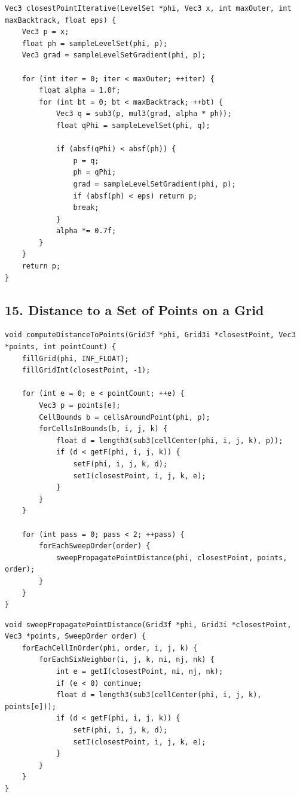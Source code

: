 \documentclass[10pt,letterpaper]{article}
\begin{document}
\begin{verbatim}
Vec3 closestPointIterative(LevelSet *phi, Vec3 x, int maxOuter, int maxBacktrack, float eps) {
    Vec3 p = x;
    float ph = sampleLevelSet(phi, p);
    Vec3 grad = sampleLevelSetGradient(phi, p);

    for (int iter = 0; iter < maxOuter; ++iter) {
        float alpha = 1.0f;
        for (int bt = 0; bt < maxBacktrack; ++bt) {
            Vec3 q = sub3(p, mul3(grad, alpha * ph));
            float qPhi = sampleLevelSet(phi, q);

            if (absf(qPhi) < absf(ph)) {
                p = q;
                ph = qPhi;
                grad = sampleLevelSetGradient(phi, p);
                if (absf(ph) < eps) return p;
                break;
            }
            alpha *= 0.7f;
        }
    }
    return p;
}
\end{verbatim}

\subsection*{15. Distance to a Set of Points on a Grid}

\begin{verbatim}
void computeDistanceToPoints(Grid3f *phi, Grid3i *closestPoint, Vec3 *points, int pointCount) {
    fillGrid(phi, INF_FLOAT);
    fillGridInt(closestPoint, -1);

    for (int e = 0; e < pointCount; ++e) {
        Vec3 p = points[e];
        CellBounds b = cellsAroundPoint(phi, p);
        forCellsInBounds(b, i, j, k) {
            float d = length3(sub3(cellCenter(phi, i, j, k), p));
            if (d < getF(phi, i, j, k)) {
                setF(phi, i, j, k, d);
                setI(closestPoint, i, j, k, e);
            }
        }
    }

    for (int pass = 0; pass < 2; ++pass) {
        forEachSweepOrder(order) {
            sweepPropagatePointDistance(phi, closestPoint, points, order);
        }
    }
}
\end{verbatim}

\begin{verbatim}
void sweepPropagatePointDistance(Grid3f *phi, Grid3i *closestPoint, Vec3 *points, SweepOrder order) {
    forEachCellInOrder(phi, order, i, j, k) {
        forEachSixNeighbor(i, j, k, ni, nj, nk) {
            int e = getI(closestPoint, ni, nj, nk);
            if (e < 0) continue;
            float d = length3(sub3(cellCenter(phi, i, j, k), points[e]));
            if (d < getF(phi, i, j, k)) {
                setF(phi, i, j, k, d);
                setI(closestPoint, i, j, k, e);
            }
        }
    }
}
\end{verbatim}
\end{document}
